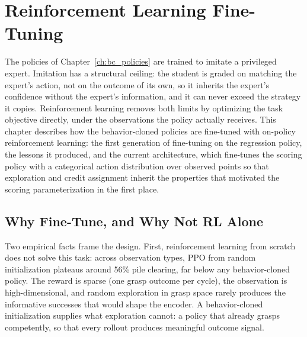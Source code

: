 
\chapter{Reinforcement Learning Fine-Tuning}
\label{ch:bcrl}

The policies of Chapter~\ref{ch:bc_policies} are trained to imitate a
privileged expert. Imitation has a structural ceiling: the student is graded
on matching the expert's action, not on the outcome of its own, so it
inherits the expert's confidence without the expert's information, and it can
never exceed the strategy it copies. Reinforcement learning removes both
limits by optimizing the task objective directly, under the observations the
policy actually receives. This chapter describes how the behavior-cloned
policies are fine-tuned with on-policy reinforcement learning: the first
generation of fine-tuning on the regression policy, the lessons it produced,
and the current architecture, which fine-tunes the scoring policy with a
categorical action distribution over observed points so that exploration and
credit assignment inherit the properties that motivated the scoring
parameterization in the first place.

\section{Why Fine-Tune, and Why Not RL Alone}
\label{sec:rl_motivation}

Two empirical facts frame the design. First, reinforcement learning from
scratch does not solve this task: across observation types, PPO from random
initialization plateaus around 56\% pile clearing, far below any
behavior-cloned policy. The reward is sparse (one grasp outcome per cycle),
the observation is high-dimensional, and random exploration in grasp space
rarely produces the informative successes that would shape the encoder. A
behavior-cloned initialization supplies what exploration cannot: a policy
that already grasps competently, so that every rollout produces meaningful
outcome signal.

